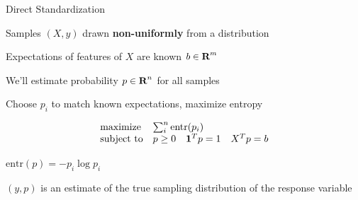\documentclass{beamer}
\begin{document}

\begin{frame}{Direct Standardization}
	\BIT
		\item Samples $(X,y)$ drawn \textbf{non-uniformly} from a distribution
		\item Expectations of features of $X$ are known $b \in {\mbox{\bf R}}^m$
		\item We'll estimate probability $p \in {\mbox{\bf R}}^n$
for all samples
		\item Choose $p_i$ to match known expectations, 
maximize entropy
	\EIT
	
	\pause
	\[
	\begin{array}{ll} \mbox{maximize} & \sum_i^n \mbox{entr}(p_i) \\
	\mbox{subject to} & p \geq 0 \quad \mathbf 1^Tp = 1 \quad X^Tp = b
	\end{array}
	\]
	
	\BIT
	\item $\mbox{entr}(p) = -p_i \log p_i$
	\item $(y,p)$ is an estimate of the true sampling distribution of the response variable
	\EIT
\end{frame}
\end{document}
